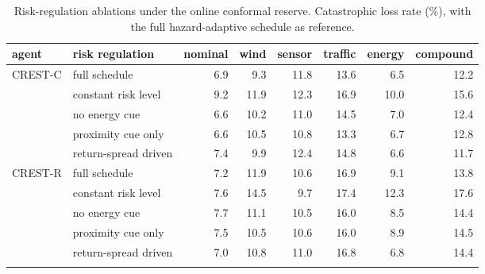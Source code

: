 \begin{table}[tb]
\centering
\caption{Risk-regulation ablations under the online conformal reserve. Catastrophic loss rate (\%), with the full hazard-adaptive schedule as reference.}
\label{tab:abl}
\small
\begin{tabular}{llrrrrrr}
\toprule
agent & risk regulation & nominal & wind & sensor & traffic & energy & compound \\
\midrule
CREST-C & full schedule & 6.9 & 9.3 & 11.8 & 13.6 & 6.5 & 12.2 \\
 & constant risk level & 9.2 & 11.9 & 12.3 & 16.9 & 10.0 & 15.6 \\
 & no energy cue & 6.6 & 10.2 & 11.0 & 14.5 & 7.0 & 12.4 \\
 & proximity cue only & 6.6 & 10.5 & 10.8 & 13.3 & 6.7 & 12.8 \\
 & return-spread driven & 7.4 & 9.9 & 12.4 & 14.8 & 6.6 & 11.7 \\
\addlinespace[2pt]
CREST-R & full schedule & 7.2 & 11.9 & 10.6 & 16.9 & 9.1 & 13.8 \\
 & constant risk level & 7.6 & 14.5 & 9.7 & 17.4 & 12.3 & 17.6 \\
 & no energy cue & 7.7 & 11.1 & 10.5 & 16.0 & 8.5 & 14.4 \\
 & proximity cue only & 7.5 & 10.5 & 10.6 & 16.0 & 8.9 & 14.5 \\
 & return-spread driven & 7.0 & 10.8 & 11.0 & 16.8 & 6.8 & 14.4 \\
\addlinespace[2pt]
\bottomrule
\end{tabular}
\end{table}